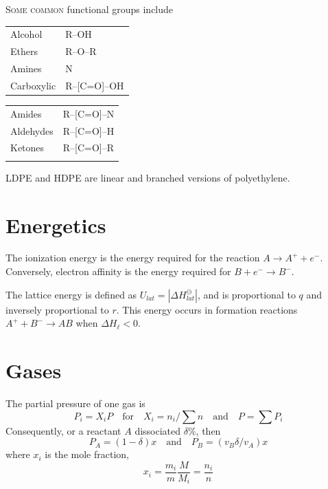 \documentclass{tufte-book}
\begin{document}
\textsc{Some common} functional groups include
%
\begin{center}
  \begin{tabular}{ll}
    Alcohol & R--OH \\
    Ethers & R--O--R \\
    Amines & N \\
    Carboxylic & R--[C=O]--OH
  \end{tabular} \qquad\qquad
  \begin{tabular}{ll}
    Amides & R--[C=O]--N \\
    Aldehydes & R--[C=O]--H \\
    Ketones & R--[C=O]--R \\
    \phantom{K}
  \end{tabular}
\end{center}
%
LDPE and HDPE are linear and branched versions of polyethylene.

\section{Energetics}
The ionization energy is the energy required for the reaction $A \to A^+ + e^-$. Conversely, electron affinity is the energy required for $B + e^- \to B^-$.

\bigskip
The lattice energy is defined as $U_{lat} = |\Delta H^\ominus_{lat}|$, and is proportional to $q$ and inversely proportional to $r$. This energy occurs in formation reactions $A^+ + B^- \to AB$ when $\Delta H_\ell < 0$.

\section{Gases}

The partial pressure of one gas is
\begin{equation}
  P_i = X_i P \quad\text{for}\quad X_i = n_i/\sum n \quad\text{and}\quad P = \sum P_i
\end{equation}
Consequently, or a reactant $A$ dissociated $\delta \%$, then \begin{equation}
  P_A = (1- \delta)x \quad\text{and}\quad P_B = (v_B \delta / v_A)x
\end{equation}
where $x_i$ is the mole fraction, \begin{equation}
  x_i = \frac{m_i}{m} \frac{M}{M_i} = \frac{n_i}{n}
\end{equation}
\end{document}

